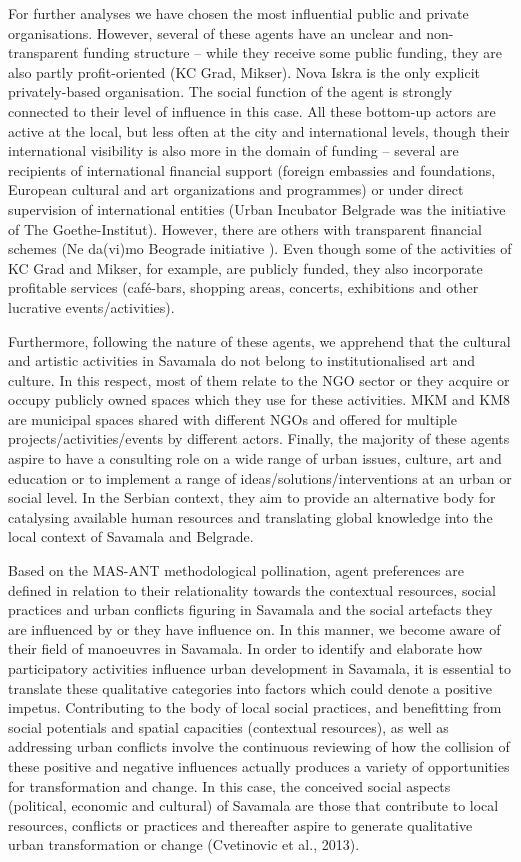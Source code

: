 \documentclass[11pt]{report}
\begin{document}
For further analyses we have chosen the most influential public and private organisations. However, several of these agents have an unclear and non-transparent funding structure – while they receive some public funding, they are also partly profit-oriented (KC Grad, Mikser). Nova Iskra is the only explicit privately-based organisation. The social function of the agent is strongly connected to their level of influence in this case. All these bottom-up actors are active at the local, but less often at the city and international levels, though their international visibility is also more in the domain of funding – several are recipients of international financial support (foreign embassies and foundations, European cultural and art organizations and programmes) or under direct supervision of international entities (Urban Incubator Belgrade was the initiative of The Goethe-Institut). However, there are others with transparent financial schemes (Ne da(vi)mo Beograde initiative ). Even though some of the activities of KC Grad and Mikser, for example, are publicly funded, they also incorporate profitable services (café-bars, shopping areas, concerts, exhibitions and other lucrative events/activities).

Furthermore, following the nature of these agents, we apprehend that the cultural and artistic activities in Savamala do not belong to institutionalised art and culture. In this respect, most of them relate to the NGO sector or they acquire or occupy publicly owned spaces which they use for these activities. MKM and KM8 are municipal spaces shared with different NGOs and offered for multiple projects/activities/events by different actors. Finally, the majority of these agents aspire to have a consulting role on a wide range of urban issues, culture, art and education or to implement a range of ideas/solutions/interventions at an urban or social level. In the Serbian context, they aim to provide an alternative body for catalysing available human resources and translating global knowledge into the local context of Savamala and Belgrade.

Based on the MAS-ANT methodological pollination, agent preferences are defined in relation to their relationality towards the contextual resources, social practices and urban conflicts figuring in Savamala and the social artefacts they are influenced by or they have influence on. In this manner, we become aware of their field of manoeuvres in Savamala. In order to identify and elaborate how participatory activities influence urban development in Savamala, it is essential to translate these qualitative categories into factors which could denote a positive impetus. Contributing to the body of local social practices, and benefitting from social potentials and spatial capacities (contextual resources), as well as addressing urban conflicts involve the continuous reviewing of how the collision of these positive and negative influences actually produces a variety of opportunities for transformation and change. In this case, the conceived social aspects (political, economic and cultural) of Savamala are those that contribute to local resources, conflicts or practices and thereafter aspire to generate qualitative urban transformation or change (Cvetinovic et al., 2013). 
\end{document}
